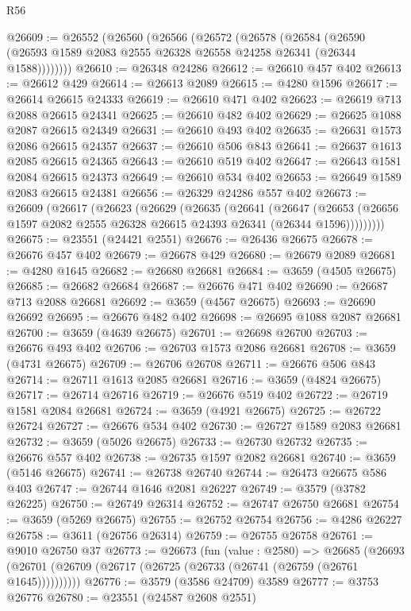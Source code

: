 \begin{lexlean}{R56}
\begin{coremodule}
@26609 := @26552
    (@26560
      (@26566
        (@26572
          (@26578
            (@26584
              (@26590 (@26593 @1589 @2083 @2555 @26328 @26558 @24258 @26341 (@26344 @1588))))))))
@26610 := @26348 @24286
@26612 := @26610 @457 @402
@26613 := @26612 @429
@26614 := @26613 @2089
@26615 := @4280 @1596
@26617 := @26614 @26615 @24333
@26619 := @26610 @471 @402
@26623 := @26619 @713 @2088 @26615 @24341
@26625 := @26610 @482 @402
@26629 := @26625 @1088 @2087 @26615 @24349
@26631 := @26610 @493 @402
@26635 := @26631 @1573 @2086 @26615 @24357
@26637 := @26610 @506 @843
@26641 := @26637 @1613 @2085 @26615 @24365
@26643 := @26610 @519 @402
@26647 := @26643 @1581 @2084 @26615 @24373
@26649 := @26610 @534 @402
@26653 := @26649 @1589 @2083 @26615 @24381
@26656 := @26329 @24286 @557 @402
@26673 := @26609
    (@26617
      (@26623
        (@26629
          (@26635
            (@26641
              (@26647
                (@26653 (@26656 @1597 @2082 @2555 @26328 @26615 @24393 @26341 (@26344 @1596)))))))))
@26675 := @23551 (@24421 @2551)
@26676 := @26436 @26675
@26678 := @26676 @457 @402
@26679 := @26678 @429
@26680 := @26679 @2089
@26681 := @4280 @1645
@26682 := @26680 @26681
@26684 := @3659 (@4505 @26675)
@26685 := @26682 @26684
@26687 := @26676 @471 @402
@26690 := @26687 @713 @2088 @26681
@26692 := @3659 (@4567 @26675)
@26693 := @26690 @26692
@26695 := @26676 @482 @402
@26698 := @26695 @1088 @2087 @26681
@26700 := @3659 (@4639 @26675)
@26701 := @26698 @26700
@26703 := @26676 @493 @402
@26706 := @26703 @1573 @2086 @26681
@26708 := @3659 (@4731 @26675)
@26709 := @26706 @26708
@26711 := @26676 @506 @843
@26714 := @26711 @1613 @2085 @26681
@26716 := @3659 (@4824 @26675)
@26717 := @26714 @26716
@26719 := @26676 @519 @402
@26722 := @26719 @1581 @2084 @26681
@26724 := @3659 (@4921 @26675)
@26725 := @26722 @26724
@26727 := @26676 @534 @402
@26730 := @26727 @1589 @2083 @26681
@26732 := @3659 (@5026 @26675)
@26733 := @26730 @26732
@26735 := @26676 @557 @402
@26738 := @26735 @1597 @2082 @26681
@26740 := @3659 (@5146 @26675)
@26741 := @26738 @26740
@26744 := @26473 @26675 @586 @403
@26747 := @26744 @1646 @2081 @26227
@26749 := @3579 (@3782 @26225)
@26750 := @26749 @26314
@26752 := @26747 @26750 @26681
@26754 := @3659 (@5269 @26675)
@26755 := @26752 @26754
@26756 := @4286 @26227
@26758 := @3611 (@26756 @26314)
@26759 := @26755 @26758
@26761 := @9010 @26750 @37
@26773 := @26673
    (fun (value : @2580) =>
    @26685 (@26693 (@26701 (@26709 (@26717 (@26725 (@26733 (@26741 (@26759 (@26761 @1645))))))))))
@26776 := @3579 (@3586 @24709) @3589
@26777 := @3753 @26776
@26780 := @23551 (@24587 @2608 @2551)

\end{coremodule}
\end{lexlean}
